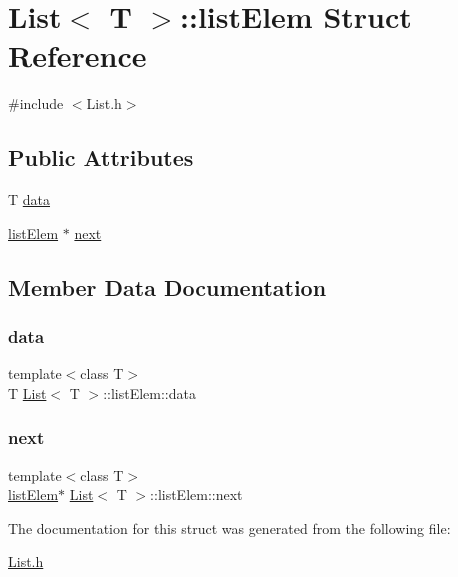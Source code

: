 \hypertarget{struct_list_1_1list_elem}{}\section{List$<$ T $>$\+:\+:list\+Elem Struct Reference}
\label{struct_list_1_1list_elem}


{\ttfamily \#include $<$List.\+h$>$}

\subsection*{Public Attributes}
\begin{DoxyCompactItemize}
\item 
T \hyperlink{struct_list_1_1list_elem_a12824c4d5a1d6d75edec6c1b8d08482f}{data}
\item 
\hyperlink{struct_list_1_1list_elem}{list\+Elem} $\ast$ \hyperlink{struct_list_1_1list_elem_adf3d9a3206aac09c39346270a6af223f}{next}
\end{DoxyCompactItemize}


\subsection{Member Data Documentation}
\mbox{\label{struct_list_1_1list_elem_a12824c4d5a1d6d75edec6c1b8d08482f}} 
\subsubsection{\texorpdfstring{data}{data}}
{\footnotesize\ttfamily template$<$class T$>$ \\
T \hyperlink{class_list}{List}$<$ T $>$\+::list\+Elem\+::data}

\mbox{\label{struct_list_1_1list_elem_adf3d9a3206aac09c39346270a6af223f}} 
\subsubsection{\texorpdfstring{next}{next}}
{\footnotesize\ttfamily template$<$class T$>$ \\
\hyperlink{struct_list_1_1list_elem}{list\+Elem}$\ast$ \hyperlink{class_list}{List}$<$ T $>$\+::list\+Elem\+::next}



The documentation for this struct was generated from the following file\+:\begin{DoxyCompactItemize}
\item 
\hyperlink{_list_8h}{List.\+h}\end{DoxyCompactItemize}

